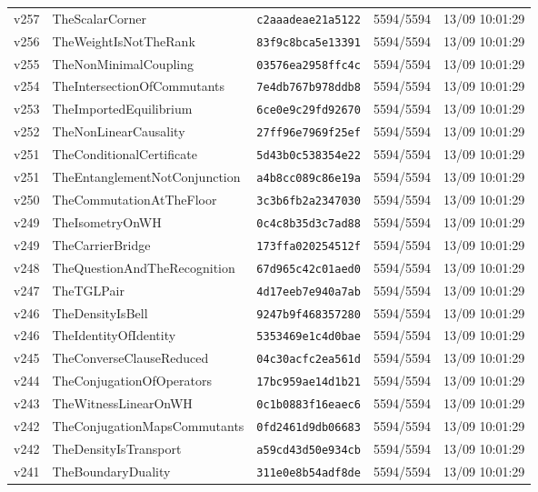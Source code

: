 \documentclass[11pt]{article}
\theoremstyle{definition}\newtheorem{deriv}{Derivação}
\begin{document}
{\begin{longtable}{@{}lllll@{}}
v257 & TheScalarCorner & \texttt{c2aaadeae21a5122} & 5594/5594 & 13/09 10:01:29 \\
v256 & TheWeightIsNotTheRank & \texttt{83f9c8bca5e13391} & 5594/5594 & 13/09 10:01:29 \\
v255 & TheNonMinimalCoupling & \texttt{03576ea2958ffc4c} & 5594/5594 & 13/09 10:01:29 \\
v254 & TheIntersectionOfCommutants & \texttt{7e4db767b978ddb8} & 5594/5594 & 13/09 10:01:29 \\
v253 & TheImportedEquilibrium & \texttt{6ce0e9c29fd92670} & 5594/5594 & 13/09 10:01:29 \\
v252 & TheNonLinearCausality & \texttt{27ff96e7969f25ef} & 5594/5594 & 13/09 10:01:29 \\
v251 & TheConditionalCertificate & \texttt{5d43b0c538354e22} & 5594/5594 & 13/09 10:01:29 \\
v251 & TheEntanglementNotConjunction & \texttt{a4b8cc089c86e19a} & 5594/5594 & 13/09 10:01:29 \\
v250 & TheCommutationAtTheFloor & \texttt{3c3b6fb2a2347030} & 5594/5594 & 13/09 10:01:29 \\
v249 & TheIsometryOnWH & \texttt{0c4c8b35d3c7ad88} & 5594/5594 & 13/09 10:01:29 \\
v249 & TheCarrierBridge & \texttt{173ffa020254512f} & 5594/5594 & 13/09 10:01:29 \\
v248 & TheQuestionAndTheRecognition & \texttt{67d965c42c01aed0} & 5594/5594 & 13/09 10:01:29 \\
v247 & TheTGLPair & \texttt{4d17eeb7e940a7ab} & 5594/5594 & 13/09 10:01:29 \\
v246 & TheDensityIsBell & \texttt{9247b9f468357280} & 5594/5594 & 13/09 10:01:29 \\
v246 & TheIdentityOfIdentity & \texttt{5353469e1c4d0bae} & 5594/5594 & 13/09 10:01:29 \\
v245 & TheConverseClauseReduced & \texttt{04c30acfc2ea561d} & 5594/5594 & 13/09 10:01:29 \\
v244 & TheConjugationOfOperators & \texttt{17bc959ae14d1b21} & 5594/5594 & 13/09 10:01:29 \\
v243 & TheWitnessLinearOnWH & \texttt{0c1b0883f16eaec6} & 5594/5594 & 13/09 10:01:29 \\
v242 & TheConjugationMapsCommutants & \texttt{0fd2461d9db06683} & 5594/5594 & 13/09 10:01:29 \\
v242 & TheDensityIsTransport & \texttt{a59cd43d50e934cb} & 5594/5594 & 13/09 10:01:29 \\
v241 & TheBoundaryDuality & \texttt{311e0e8b54adf8de} & 5594/5594 & 13/09 10:01:29 \\

\end{longtable}}
\end{document}
